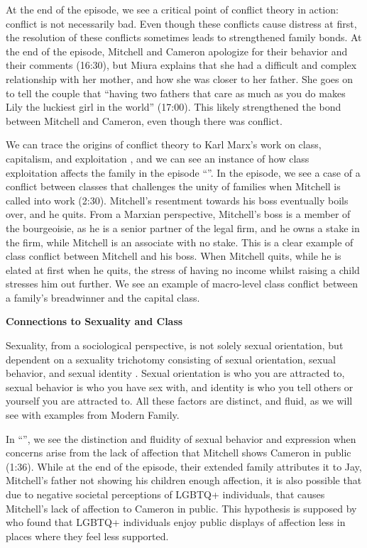 \documentclass[12pt, letterpaper]{article}
\begin{document}
At the end of the episode, we see a critical point of conflict theory in action: conflict is not necessarily bad. Even though these conflicts cause distress at first, the resolution of these conflicts sometimes leads to strengthened family bonds. At the end of the episode, Mitchell and Cameron apologize for their behavior and their comments (16:30), but Miura explains that she had a difficult and complex relationship with her mother, and how she was closer to her father. She goes on to tell the couple that ``having two fathers that care as much as you do makes Lily the luckiest girl in the world'' (17:00). This likely strengthened the bond between Mitchell and Cameron, even though there was conflict.

We can trace the origins of conflict theory to Karl Marx's work on class, capitalism, and exploitation \autocite[32]{mitchell:2018}, and we can see an instance of how class exploitation affects the family in the episode ``''. In the episode, we see a case of a conflict between classes that challenges the unity of families when Mitchell is called into work (2:30). Mitchell's resentment towards his boss eventually boils over, and he quits. From a Marxian perspective, Mitchell's boss is a member of the bourgeoisie, as he is a senior partner of the legal firm, and he owns a stake in the firm, while Mitchell is an associate with no stake. This is a clear example of class conflict between Mitchell and his boss. When Mitchell quits, while he is elated at first when he quits, the stress of having no income whilst raising a child stresses him out further. We see an example of macro-level class conflict between a family's breadwinner and the capital class.

\begin{center}
    \textbf{Connections to Sexuality and Class}
\end{center}

Sexuality, from a sociological perspective, is not solely sexual orientation, but dependent on a sexuality trichotomy consisting of sexual orientation, sexual behavior, and sexual identity \autocite{sexuality_lecture}. Sexual orientation is who you are attracted to, sexual behavior is who you have sex with, and identity is who you tell others or yourself you are attracted to. All these factors are distinct, and fluid, as we will see with examples from Modern Family.

In ``'', we see the distinction and fluidity of sexual behavior and expression when concerns arise from the lack of affection that Mitchell shows Cameron in public (1:36). While at the end of the episode, their extended family attributes it to Jay, Mitchell's father not showing his children enough affection, it is also possible that due to negative societal perceptions of LGBTQ+ individuals, that causes Mitchell's lack of affection to Cameron in public. This hypothesis is supposed by \autocite{stammwitz2021public} who found that LGBTQ+ individuals enjoy public displays of affection less in places where they feel less supported.
\end{document}
